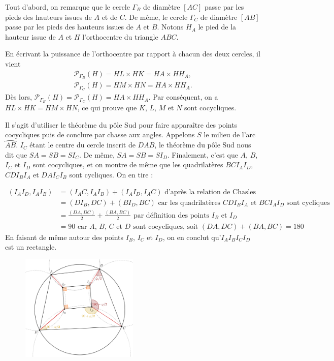 \begin{sol}
Tout d'abord, on remarque que le cercle $\Gamma_B$ de diamètre $[AC]$ passe par les pieds des hauteurs issues de $A$ et de $C$. De même, le cercle $\Gamma_C$ de diamètre $[AB]$ passe par les pieds des hauteurs issues de $A$ et $B$. Notons $H_A$ le pied de la hauteur issue de $A$ et $H$ l'orthocentre du triangle $ABC$.

En écrivant la puissance de l'orthocentre par rapport à chacun des deux cercles, il vient
\begin{gather*}
    \mathcal{P}_{\Gamma_B}(H) = HL \times HK = HA \times HH_A,  \\
    \mathcal{P}_{\Gamma_C}(H) = HM \times HN = HA \times HH_A.
\end{gather*}
Dès lors, $\mathcal{P}_{\Gamma_B}(H) = \mathcal{P}_{\Gamma_C}(H) = HA \times HH_A$. Par conséquent, on a $HL \times HK = HM \times HN$, ce qui prouve que $K$, $L$, $M$ et $N$ sont cocycliques.
\end{sol}


\begin{sol}
Il s'agit d'utiliser le théorème du pôle Sud pour faire apparaître des points cocycliques puis de conclure par chasse aux angles. Appelons $S$ le milieu de l'arc $\wideparen{AB}$. $I_C$ étant le centre du cercle inscrit de $DAB$, le théorème du pôle Sud nous dit que $SA=SB=SI_C$. De même, $SA=SB=SI_D$. Finalement, c'est que $A$, $B$, $I_C$ et $I_D$ sont cocycliques, et on montre de même que les quadrilatères $BCI_AI_D$, $CDI_BI_A$ et $DAI_CI_B$ sont cycliques. On en tire :

\begin{align*}
(I_AI_D,I_AI_B)  &= (I_AC,I_AI_B)+(I_AI_D,I_AC) \text{\ \ d'après la relation de Chasles}\\
&= (DI_B,DC)+(BI_D,BC) \text{\ \ car les quadrilatères $CDI_BI_A$ et $BCI_AI_D$ sont cycliques}\\
&= \frac{(DA,DC)}{2}+\frac{(BA,BC)}{2} \text{\ \ par définition des points $I_B$ et $I_D$}\\
&= 90 \text{\ \ car $A$, $B$, $C$ et $D$ sont cocycliques, soit $(DA,DC)+(BA,BC)=180$}
\end{align*}
En faisant de même autour des points $I_B$, $I_C$ et $I_D$, on en conclut qu'$I_AI_BI_CI_D$ est un rectangle.

\begin{figure}[!h]
\centerline{\includegraphics[width=0.5\textwidth]{rectangle_X}}
\end{figure}
\end{sol}


